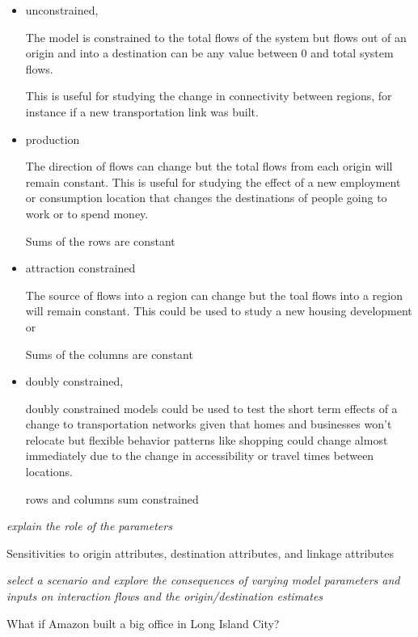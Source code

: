 \documentclass[11pt]{article} %
\begin{document}
 \begin{itemize}
\item unconstrained, 

The model is constrained to the total flows of the system but flows out of an origin and into a destination can be any value between 0 and total system flows. 

This is useful for studying the change in connectivity between regions, for instance if a new transportation link was built. 

\item production 

The direction of flows can change but the total flows from each origin will remain constant. This is useful for studying the effect of a new employment or consumption location that changes the destinations of people going to work or to spend money. 

Sums of the rows are constant

\item attraction constrained

The source of flows into a region can change but the toal flows into a region will remain constant. This could be used to study a new housing development or 

Sums of the columns are constant

\item doubly constrained,

doubly constrained models could be used to test the short term effects of a change to transportation networks given that homes and businesses won't relocate but flexible behavior patterns like shopping could change almost immediately due to the change in accessibility or travel times between locations. 

rows and columns sum constrained

\end{itemize}

\textit{explain the role of the parameters}

Sensitivities to origin attributes, destination attributes, and linkage attributes

\textit{select a scenario and explore the consequences of varying model parameters and inputs on interaction flows and the origin/destination estimates}


What if Amazon built a big office in Long Island City? 



\end{document}

